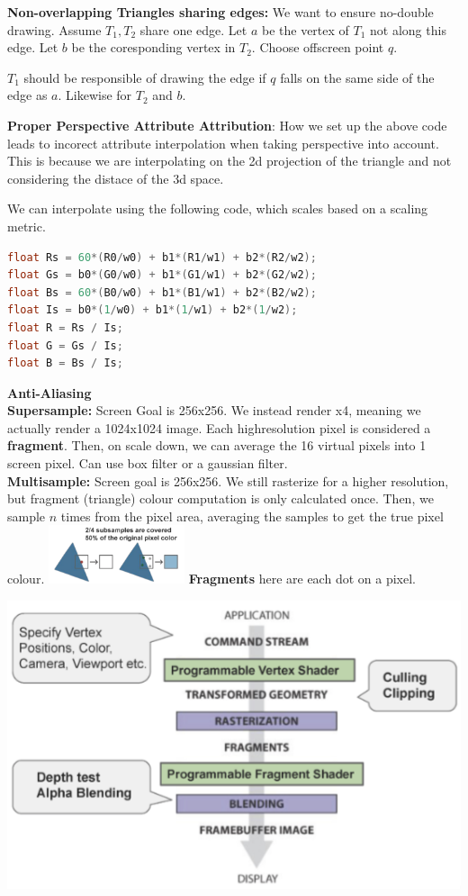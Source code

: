 \documentclass[letterpaper, 8pt]{extarticle}
\begin{document}
\begin{multicols*}{4}

\textbf{Non-overlapping Triangles sharing edges:} We want to ensure no-double drawing.
Assume $T_1, T_2$ share one edge. Let $a$ be the vertex of $T_1$ not along this edge. Let $b$ be the coresponding vertex in $T_2$.
Choose offscreen point $q$.

$T_1$ should be responsible of drawing the edge if $q$ falls on the same side of the edge as $a$. Likewise for $T_2$ and $b$.


\textbf{Proper Perspective Attribute Attribution}: How we set up the above code leads to incorect attribute interpolation when taking perspective into account.
This is because we are interpolating on the 2d projection of the triangle and not considering the distace of the 3d space.

We can interpolate using the following code, which scales based on a scaling metric.

\begin{lstlisting}[language=C++]
float Rs = 60*(R0/w0) + b1*(R1/w1) + b2*(R2/w2);
float Gs = b0*(G0/w0) + b1*(G1/w1) + b2*(G2/w2);
float Bs = 60*(B0/w0) + b1*(B1/w1) + b2*(B2/w2);
float Is = b0*(1/w0) + b1*(1/w1) + b2*(1/w2);
float R = Rs / Is;
float G = Gs / Is;
float B = Bs / Is;
\end{lstlisting}


\textbf{Anti-Aliasing}\\
\textbf{Supersample: }Screen Goal is 256x256. We instead render x4, meaning we actually render a 1024x1024 image. Each highresolution pixel is considered a \textbf{fragment}.
Then, on scale down, we can average the 16 virtual pixels into 1 screen pixel.
Can use box filter or a gaussian filter.\\
\textbf{Multisample: }
Screen goal is 256x256. We still rasterize for a higher resolution, but fragment (triangle) colour computation is only calculated once.
Then, we sample $n$ times from the pixel area, averaging the samples to get the true pixel colour.
\includegraphics[width=4cm]{multi-sampling.png}
\textbf{Fragments} here are each dot on a pixel.


\includegraphics[width=.3\linewidth]{basic-graphics-pipeline.png}

\end{multicols*}
\end{document}
